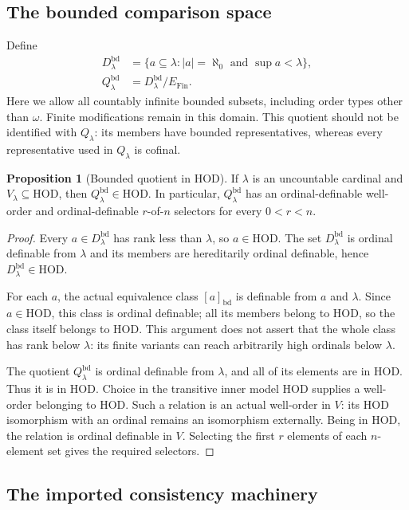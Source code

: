 \documentclass[11pt,letterpaper]{article}
\theoremstyle{definition}
\newtheorem{proposition}[definition]{Proposition}
\newcommand{\HOD}{\mathrm{HOD}}
\newcommand{\Fin}{\operatorname{Fin}}
\newcommand{\bd}{\mathrm{bd}}
\begin{document}
\subsection{The bounded comparison space}

Define
\begin{align}
 D^\bd_\lambda
 &=\{a\subseteq\lambda:|a|=\aleph_0\text{ and }\sup a<\lambda\},\\
 Q^\bd_\lambda&=D^\bd_\lambda/E_{\Fin}.
\end{align}
Here we allow all countably infinite bounded subsets, including order types other than $\omega$. Finite modifications remain in this domain. This quotient should not be identified with $Q_\lambda$: its members have bounded representatives, whereas every representative used in $Q_\lambda$ is cofinal.

\begin{proposition}[Bounded quotient in HOD]\label{prop:bounded}
If $\lambda$ is an uncountable cardinal and $V_\lambda\subseteq\HOD$, then $Q^\bd_\lambda\in\HOD$. In particular, $Q^\bd_\lambda$ has an ordinal-definable well-order and ordinal-definable $r$-of-$n$ selectors for every $0<r<n$.
\end{proposition}

\begin{proof}
Every $a\in D^\bd_\lambda$ has rank less than $\lambda$, so $a\in\HOD$. The set $D^\bd_\lambda$ is ordinal definable from $\lambda$ and its members are hereditarily ordinal definable, hence $D^\bd_\lambda\in\HOD$.

For each $a$, the actual equivalence class $[a]_{\bd}$ is definable from $a$ and $\lambda$. Since $a\in\HOD$, this class is ordinal definable; all its members belong to $\HOD$, so the class itself belongs to $\HOD$. This argument does not assert that the whole class has rank below $\lambda$: its finite variants can reach arbitrarily high ordinals below $\lambda$.

The quotient $Q^\bd_\lambda$ is ordinal definable from $\lambda$, and all of its elements are in HOD. Thus it is in HOD. Choice in the transitive inner model HOD supplies a well-order belonging to HOD. Such a relation is an actual well-order in $V$: its HOD isomorphism with an ordinal remains an isomorphism externally. Being in HOD, the relation is ordinal definable in $V$. Selecting the first $r$ elements of each $n$-element set gives the required selectors.
\end{proof}

\subsection{The imported consistency machinery}
\end{document}
